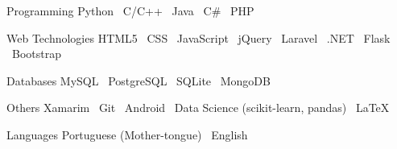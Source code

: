 

\begin{cvskills}

  \cvskill
    {Programming} %
    {Python  \textbullet\ C/C++  \textbullet\ Java  \textbullet\ C\#  \textbullet\ PHP } %

  \cvskill
    {Web Technologies} %
    {HTML5  \textbullet\ CSS  \textbullet\ JavaScript  \textbullet\ jQuery  \textbullet\ Laravel  \textbullet\ .NET  \textbullet\ Flask  \textbullet\ Bootstrap } %
    
  \cvskill
    {Databases} %
    {MySQL  \textbullet\ PostgreSQL  \textbullet\ SQLite  \textbullet\ MongoDB } %
    
  \cvskill
    {Others} %
    {Xamarim  \textbullet\ Git  \textbullet\ Android  \textbullet\ Data Science (scikit-learn, pandas)  \textbullet\ LaTeX } %

  \cvskill
    {Languages} %
    {Portuguese (Mother-tongue)  \textbullet\ English } %

\end{cvskills}